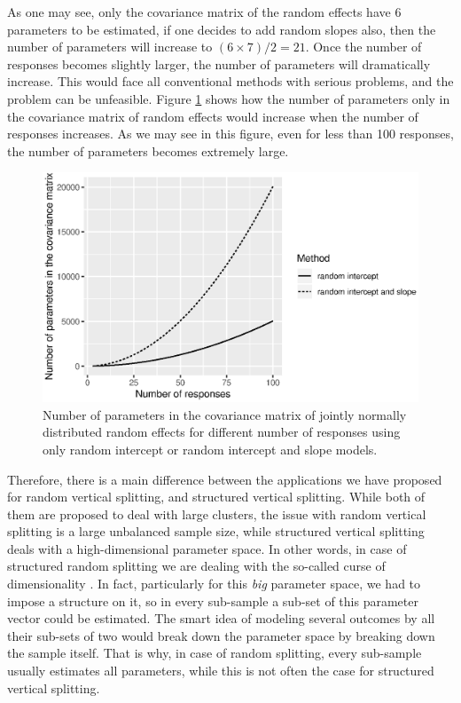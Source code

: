 \documentclass[11pt,a5paper,twoside]{book}
\begin{document}
As one may see, only the covariance matrix of the random effects have $6$ parameters to be estimated, if one decides to add random slopes also, then the number of parameters will increase to $(6\times7)/2 = 21$. Once the number of responses becomes slightly larger, the number of parameters will dramatically increase. This would face all conventional methods with serious problems, and the problem can be unfeasible. Figure \ref{fig_strucVert} shows how the number of parameters only in the covariance matrix of random effects would increase when the number of responses increases. As we may see in this figure, even for less than 100 responses, the number of parameters becomes extremely large.

\begin{figure}
\centering
\includegraphics[width=\textwidth]{strucVert.eps}
\caption{Number of parameters in the covariance matrix of jointly normally distributed random effects for different number of responses using only random intercept or random intercept and slope models.} 
\label{fig_strucVert}
\end{figure} 

Therefore, there is a main difference between the applications we have proposed for random vertical splitting, and structured vertical splitting. While both of them are proposed to deal with large clusters, the issue with random vertical splitting is a large unbalanced sample size, while structured vertical splitting deals with a high-dimensional parameter space. In other words, in case of structured random splitting we are dealing with the so-called curse of dimensionality \citep{donoho2000}. In fact, particularly for this \emph{big} parameter space, we had to impose a structure on it, so in every sub-sample a sub-set of this parameter vector could be estimated. The smart idea of modeling several outcomes by all their sub-sets of two would break down the parameter space by breaking down the sample itself. That is why, in case of random splitting, every sub-sample usually estimates all parameters, while this is not often the case for structured vertical splitting. 
\end{document}

